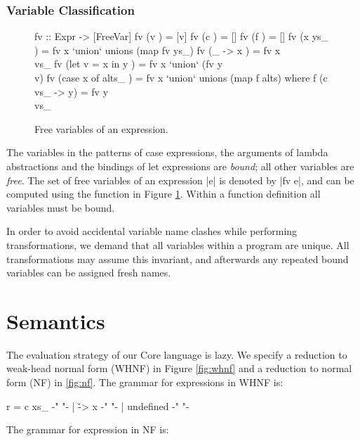 \subsubsection{Variable Classification}

\begin{figure}
\begin{code}
fv :: Expr -> [FreeVar]
fv (v                ) = [v]
fv (c                ) = []
fv (f                ) = []
fv (x ys_            ) = fv x `union` unions (map fv ys_)
fv (\vs_ -> x        ) = fv x \\ vs_
fv (let v = x in y   ) = fv x `union` (fv y \\ v)
fv (case x of alts_  ) = fv x `union` unions (map f alts)
    where f (c vs_ -> y) = fv y \\ vs_
\end{code}
\caption{Free variables of an expression.}
\label{fig:free_variables}
\end{figure}

The variables in the patterns of case expressions, the arguments of lambda abstractions and the bindings of let expressions are \textit{bound}; all other variables are \textit{free}. The set of free variables of an expression |e| is denoted by |fv e|, and can be computed using the function in Figure \ref{fig:free_variables}. Within a function definition all variables must be bound.

In order to avoid accidental variable name clashes while performing transformations, we demand that all variables within a program are unique. All transformations may assume this invariant, and afterwards any repeated bound variables can be assigned fresh names.

\section{Semantics}
\label{sec:semantics}

The evaluation strategy of our Core language is lazy. We specify a reduction to weak-head normal form (WHNF) in Figure \ref{fig:whnf} and a reduction to normal form (NF) in \ref{fig:nf}. The grammar for expressions in WHNF is:

\begin{code}
r  =  c \< xs_ \>  {-"  "-}
   |  \v -> x      {-"  "-}
   |  undefined    {-"  "-}
\end{code}

The grammar for expression in NF is:

